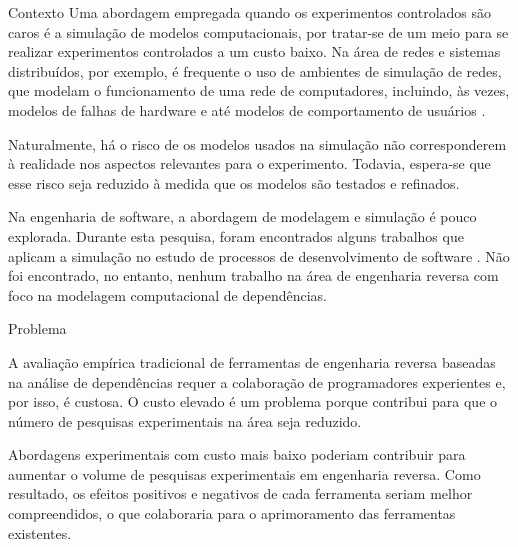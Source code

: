 \begin{section}{Contexto}
		Uma abordagem empregada quando os experimentos controlados são caros é a simulação de modelos computacionais, por tratar-se de um meio para se realizar experimentos controlados a um custo baixo. Na área de redes e sistemas distribuídos, por exemplo, é frequente o uso de ambientes de simulação de redes, que modelam o funcionamento de uma rede de computadores, incluindo, às vezes, modelos de falhas de hardware e até modelos de comportamento de usuários \cite{White2002}. 
		
		Naturalmente, há o risco de os modelos usados na simulação não corresponderem à realidade nos aspectos relevantes para o experimento. Todavia, espera-se que esse risco seja reduzido à medida que os modelos são testados e refinados.

		Na engenharia de software, a abordagem de modelagem e simulação é pouco explorada. Durante esta pesquisa, foram encontrados alguns trabalhos que aplicam a simulação no estudo de processos de desenvolvimento de software \cite{Stopford2008}. Não foi encontrado, no entanto, nenhum trabalho na área de engenharia reversa com foco na modelagem computacional de dependências.
		
\end{section}

\begin{section}{Problema}
	
	A avaliação empírica tradicional de ferramentas de engenharia reversa baseadas na análise de dependências requer a colaboração de programadores experientes e, por isso, é custosa. O custo elevado é um problema porque contribui para que o número de pesquisas experimentais na área seja reduzido. 
	
  Abordagens experimentais com custo mais baixo poderiam contribuir para aumentar o volume de pesquisas experimentais em engenharia reversa. Como resultado, os efeitos positivos e negativos de cada ferramenta seriam melhor compreendidos, o que colaboraria para o aprimoramento das ferramentas existentes.
	
	
\end{section}

